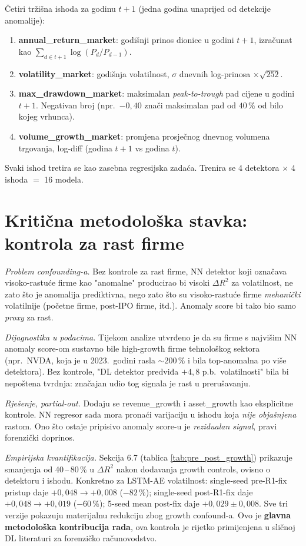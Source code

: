 \documentclass[diplomskirad,authoryear]{fer}
\begin{document}
Četiri tržišna ishoda za godinu $t+1$ (jedna godina unaprijed od detekcije anomalije):

\begin{enumerate}
 \item \textbf{annual\_return\_market}: godišnji prinos dionice u godini $t+1$, izračunat kao $\sum_{d \in t+1} \log(P_d / P_{d-1})$.
 \item \textbf{volatility\_market}: godišnja volatilnost, $\sigma$ dnevnih log-prinosa $\times \sqrt{252}$.
 \item \textbf{max\_drawdown\_market}: maksimalan \emph{peak-to-trough} pad cijene u godini $t+1$. Negativan broj (npr.\ $-0{,}40$ znači maksimalan pad od $40\,\%$ od bilo kojeg vrhunca).
 \item \textbf{volume\_growth\_market}: promjena prosječnog dnevnog volumena trgovanja, log-diff (godina $t+1$ vs godina $t$).
\end{enumerate}

Svaki ishod tretira se kao zasebna regresijska zadaća. Trenira se 4 detektora $\times$ 4 ishoda $=$ 16 modela.

\section{Kritična metodološka stavka: kontrola za rast firme}

\emph{Problem confounding-a.} Bez kontrole za rast firme, NN detektor koji označava visoko-rastuće firme kao "anomalne" producirao bi visoki $\Delta R^2$ za volatilnost, ne zato što je anomalija prediktivna, nego zato što su visoko-rastuće firme \emph{mehanički} volatilnije (početne firme, post-IPO firme, itd.). Anomaly score bi tako bio samo \emph{proxy} za rast.

\emph{Dijagnostika u podacima.} Tijekom analize utvrđeno je da su firme s najvišim NN anomaly score-om sustavno bile high-growth firme tehnološkog sektora (npr.\ NVDA, koja je u 2023.\ godini rasla $\sim 200\,\%$ i bila top-anomalna po više detektora). Bez kontrole, "DL detektor predviđa $+4{,}8$ p.b.\ volatilnosti" bila bi nepoštena tvrdnja: značajan udio tog signala je rast u prerušavanju.

\emph{Rješenje, partial-out.} Dodaju se revenue\_growth i asset\_growth kao eksplicitne kontrole. NN regresor sada mora pronaći varijaciju u ishodu koja \emph{nije objašnjena} rastom. Ono što ostaje pripisivo anomaly score-u je \emph{rezidualan signal}, pravi forenzički doprinos.

\emph{Empirijska kvantifikacija.} Sekcija 6.7 (tablica \ref{tab:pre_post_growth}) prikazuje smanjenja od 40\,--\,80\,\% u $\Delta R^2$ nakon dodavanja growth controls, ovisno o detektoru i ishodu. Konkretno za LSTM-AE volatilnost: single-seed pre-R1-fix pristup daje $+0{,}048 \to +0{,}008$ ($-82\,\%$); single-seed post-R1-fix daje $+0{,}048 \to +0{,}019$ ($-60\,\%$); 5-seed mean post-fix daje $+0{,}029 \pm 0{,}008$. Sve tri verzije pokazuju materijalnu redukciju zbog growth confound-a. Ovo je \textbf{glavna metodološka kontribucija rada}, ova kontrola je rijetko primijenjena u sličnoj DL literaturi za forenzičko računovodstvo.
\end{document}
